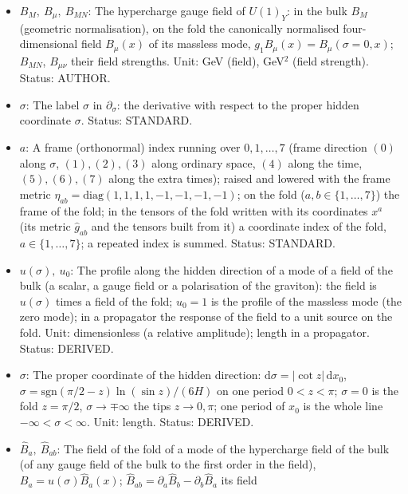 \documentclass[
  10pt,
]{article}
\providecommand{\tightlist}{%
  \setlength{\itemsep}{0pt}\setlength{\parskip}{0pt}}
\begin{document}
\begin{itemize}
\tightlist
\item
  \(B_M,\ B_\mu,\ B_{MN}\): The hypercharge gauge field of \(U(1)_Y\):
  in the bulk \(B_M\) (geometric normalisation), on the fold the
  canonically normalised four-dimensional field \(B_\mu(x)\) of its
  massless mode, \(g_1B_\mu(x) = B_\mu(\sigma = 0, x)\); \(B_{MN}\),
  \(B_{\mu\nu}\) their field strengths. Unit: GeV (field), GeV\(^2\)
  (field strength). Status: AUTHOR.
\item
  \(\sigma\): The label \(\sigma\) in \(\partial_\sigma\): the
  derivative with respect to the proper hidden coordinate \(\sigma\).
  Status: STANDARD.
\item
  \(a\): A frame (orthonormal) index running over \(0, 1, \dots, 7\)
  (frame direction \((0)\) along \(\sigma\), \((1), (2), (3)\) along
  ordinary space, \((4)\) along the time, \((5), (6), (7)\) along the
  extra times); raised and lowered with the frame metric
  \(\eta_{ab} = \mathrm{diag}(1, 1, 1, 1, -1, -1, -1, -1)\); on the fold
  (\(a, b \in \{1, \dots, 7\}\)) the frame of the fold; in the tensors
  of the fold written with its coordinates \(x^a\) (its metric
  \(\hat g_{ab}\) and the tensors built from it) a coordinate index of
  the fold, \(a \in \{1, \dots, 7\}\); a repeated index is summed.
  Status: STANDARD.
\item
  \(u(\sigma),\ u_0\): The profile along the hidden direction of a mode
  of a field of the bulk (a scalar, a gauge field or a polarisation of
  the graviton): the field is \(u(\sigma)\) times a field of the fold;
  \(u_0 = 1\) is the profile of the massless mode (the zero mode); in a
  propagator the response of the field to a unit source on the fold.
  Unit: dimensionless (a relative amplitude); length in a propagator.
  Status: DERIVED.
\item
  \(\sigma\): The proper coordinate of the hidden direction:
  \(\mathrm{d}\sigma = \lvert\cot z\rvert\,\mathrm{d}x_0\),
  \(\sigma = \mathrm{sgn}(\pi/2 - z)\ln(\sin z)/(6H)\) on one period
  \(0 < z < \pi\); \(\sigma = 0\) is the fold \(z = \pi/2\),
  \(\sigma \to \mp\infty\) the tips \(z \to 0, \pi\); one period of
  \(x_0\) is the whole line \(-\infty < \sigma < \infty\). Unit: length.
  Status: DERIVED.
\item
  \(\hat B_a,\ \hat B_{ab}\): The field of the fold of a mode of the
  hypercharge field of the bulk (of any gauge field of the bulk to the
  first order in the field), \(B_a = u(\sigma)\hat B_a(x)\);
  \(\hat B_{ab} = \partial_a\hat B_b - \partial_b\hat B_a\) its field

\end{itemize}
\end{document}
